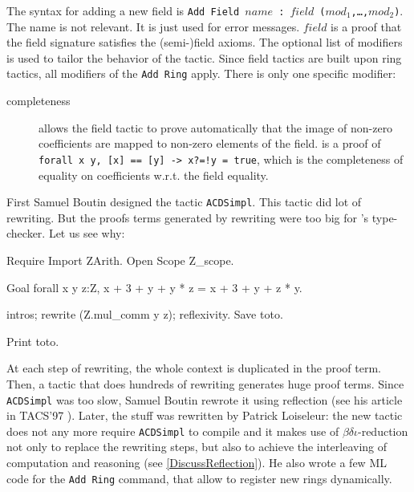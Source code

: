 The syntax for adding a new field is {\tt Add Field $name$ : $field$
($mod_1$,\dots,$mod_2$)}.  The name is not relevant. It is just used
for error messages. $field$ is a proof that the field signature
satisfies the (semi-)field axioms. The optional list of modifiers is
used to tailor the behavior of the tactic. Since field tactics are
built upon ring tactics, all modifiers of the {\tt Add Ring}
apply. There is only one specific modifier:
\begin{description}
\item[completeness \term] allows the field tactic to prove
  automatically that the image of non-zero coefficients are mapped to
  non-zero elements of the field. \term is a proof of {\tt forall x y,
    [x] == [y] -> x?=!y = true}, which is the completeness of equality
  on coefficients w.r.t. the field equality.
\end{description}


First Samuel Boutin designed the tactic \texttt{ACDSimpl}. 
This tactic did lot of rewriting. But the proofs
terms generated by rewriting were too big for \Coq's type-checker.
Let us see why:

\begin{coq_eval}
Require Import ZArith.
Open Scope Z_scope.
\end{coq_eval}
\begin{coq_example}
Goal forall x y z:Z, x + 3 + y + y * z = x + 3 + y + z * y.
\end{coq_example}
\begin{coq_example*}
intros; rewrite (Z.mul_comm y z); reflexivity.
Save toto.
\end{coq_example*}
\begin{coq_example}
Print  toto.
\end{coq_example}

At each step of rewriting, the whole context is duplicated in the proof
term. Then, a tactic that does hundreds of rewriting generates huge proof
terms. Since \texttt{ACDSimpl} was too slow, Samuel Boutin rewrote it
using reflection (see his article in TACS'97 \cite{Bou97}). Later, the
stuff was rewritten by Patrick
Loiseleur: the new tactic does not any more require \texttt{ACDSimpl}
to compile and it makes use of $\beta\delta\iota$-reduction 
not only to replace the rewriting steps, but also to achieve the
interleaving of computation and 
reasoning (see \ref{DiscussReflection}). He also wrote a
few ML code for the \texttt{Add Ring} command, that allow to register
new rings dynamically.

